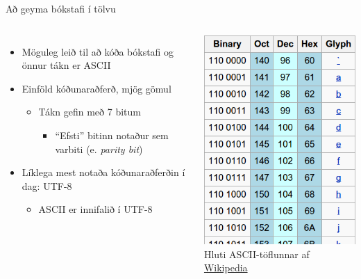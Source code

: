 \documentclass[handout]{beamer}
\begin{document}
\begin{frame}{Að geyma bókstafi í tölvu}
\begin{columns}
\begin{itemize}
 \item Möguleg leið til að kóða bókstafi og önnur tákn er ASCII
 \item Einföld kóðunaraðferð, mjög gömul
 \begin{itemize}
  \item Tákn gefin með 7 bitum
  \begin{itemize}
   \item ``Efsti'' bitinn notaður sem varbiti (e. \emph{parity bit})
  \end{itemize}
 \end{itemize}
 \item Líklega mest notaða kóðunaraðferðin í dag: UTF-8
 \begin{itemize}
  \item ASCII er innifalið í UTF-8
 \end{itemize}
\end{itemize}
\includegraphics[width=\linewidth]{Pics/ascii-table}
\\Hluti ASCII-töflunnar af \href{https://en.wikipedia.org/wiki/ASCII}{Wikipedia}
\end{columns}
\end{frame}
\end{document}
